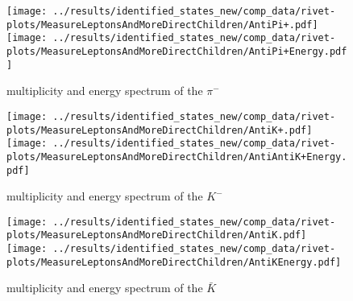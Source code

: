 \begin{figure}[h]
  \centering
  \texttt{[image: ../results/identified\_states\_new/comp\_data/rivet-plots/MeasureLeptonsAndMoreDirectChildren/AntiPi+.pdf]}
  \texttt{[image: ../results/identified\_states\_new/comp\_data/rivet-plots/MeasureLeptonsAndMoreDirectChildren/AntiPi+Energy.pdf]}
  \caption{multiplicity and energy spectrum of the \(\pi^-\)}
\end{figure}
\begin{figure}[h]
  \centering
  \texttt{[image: ../results/identified\_states\_new/comp\_data/rivet-plots/MeasureLeptonsAndMoreDirectChildren/AntiK+.pdf]}
  \texttt{[image: ../results/identified\_states\_new/comp\_data/rivet-plots/MeasureLeptonsAndMoreDirectChildren/AntiAntiK+Energy.pdf]}
  \caption{multiplicity and energy spectrum of the \(K^-\)}
\end{figure}
\begin{figure}[h]
  \centering
  \texttt{[image: ../results/identified\_states\_new/comp\_data/rivet-plots/MeasureLeptonsAndMoreDirectChildren/AntiK.pdf]}
  \texttt{[image: ../results/identified\_states\_new/comp\_data/rivet-plots/MeasureLeptonsAndMoreDirectChildren/AntiKEnergy.pdf]}
  \caption{multiplicity and energy spectrum of the \(\bar{K}\)}
\end{figure}


